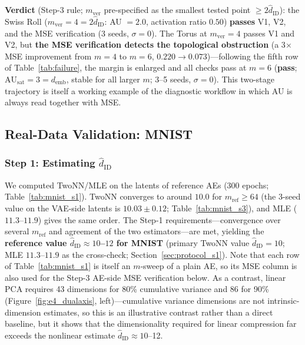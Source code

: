 \documentclass[make,article,submit,pdftex,moreauthors]{Definitions/mdpi}
\newcommand{\hatdID}{\hat{d}_{\mathrm{ID}}}
\newcommand{\AUsat}{\mathrm{AU}_{\mathrm{sat}}}
\newcommand{\demb}{d_{\mathrm{emb}}}
\begin{document}
\textbf{Verdict} (Step-3 rule; $m_{\mathrm{ver}}$ pre-specified as the
smallest tested point $\geq 2\hatdID$): the Swiss Roll
($m_{\mathrm{ver}} = 4 = 2\hatdID$: AU $= 2.0$, activation ratio $0.50$)
\textbf{passes} V1, V2, and the MSE verification (3 seeds, $\sigma = 0$).
The Torus at $m_{\mathrm{ver}} = 4$ passes V1 and V2, but \textbf{the MSE
verification detects the topological obstruction} (a 3$\times$ MSE
improvement from $m = 4$ to $m = 6$, $0.220 \to 0.073$)---following the
fifth row of Table~\ref{tab:failure}, the margin is enlarged and all
checks pass at $m = 6$ (\textbf{pass}; $\AUsat = 3 = \demb$, stable for
all larger $m$; 3--5 seeds, $\sigma = 0$).
This two-stage trajectory is itself a working example of the diagnostic
workflow in which AU is always read together with MSE.

\subsection{Real-Data Validation: MNIST}\label{sec:exp_mnist}

\subsubsection{Step 1: Estimating $\hatdID$}

We computed TwoNN/MLE on the latents of reference AEs (300 epochs;
Table~\ref{tab:mnist_s1}).
TwoNN converges to around $10.0$ for $m_{\mathrm{ref}} \geq 64$
(the 3-seed value on the VAE-side latents is $10.03 \pm 0.12$;
Table~\ref{tab:mnist_s3}), and MLE
($11.3$--$11.9$) gives the same order.
The Step-1 requirements---convergence over several $m_{\mathrm{ref}}$ and
agreement of the two estimators---are met, yielding the
\textbf{reference value $\hatdID \approx 10$--$12$ for MNIST}
(primary TwoNN value $\hatdID = 10$; MLE $11.3$--$11.9$ as the
cross-check; Section~\ref{sec:protocol_s1}).
Note that each row of Table~\ref{tab:mnist_s1} is itself an $m$-sweep of a
plain AE, so its MSE column is also used for the Step-3 AE-side MSE
verification below.
As a contrast, linear PCA requires 43 dimensions for 80\% cumulative
variance and 86 for 90\% (Figure~\ref{fig:e4_dualaxis}, left)---cumulative
variance dimensions are not intrinsic-dimension estimates, so this is an
illustrative contrast rather than a direct baseline, but it shows that the
dimensionality required for linear compression far exceeds the nonlinear
estimate $\hatdID \approx 10$--12.
\end{document}
